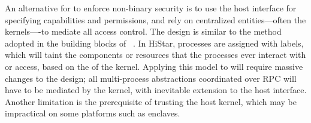 

An alternative for \picoprocs{} to enforce non-binary security
is to use the host interface
for specifying capabilities and permissions,
and rely on centralized entities---often the kernels----to mediate all 
access control.
The design is similar to the method adopted in the building blocks of ~\citep{zeldovich+histar}.
In HiStar, processes are assigned with labels, which will taint the components or resources that the processes ever interact with or access,
based on the  of the kernel.
Applying this model to \graphene{} will require
massive changes to the design;
all multi-process abstractions coordinated over RPC will have to be mediated by the kernel, with inevitable extension to the host interface.
Another limitation is the prerequisite of
trusting the host kernel,
which may be impractical on some platforms such as \sgx{} enclaves.


